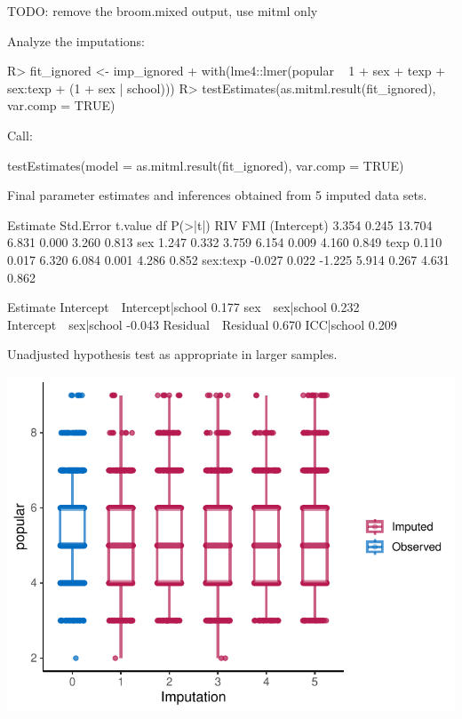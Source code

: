 \documentclass[
]{jss}
\begin{document}
TODO: remove the broom.mixed output, use mitml only

Analyze the imputations:

\begin{CodeChunk}
\begin{CodeInput}
R> fit_ignored <- imp_ignored %
+   with(lme4::lmer(popular ~ 1 + sex + texp + sex:texp + (1 + sex | school))) 
R> testEstimates(as.mitml.result(fit_ignored), var.comp = TRUE)
\end{CodeInput}
\begin{CodeOutput}

Call:

testEstimates(model = as.mitml.result(fit_ignored), var.comp = TRUE)

Final parameter estimates and inferences obtained from 5 imputed data sets.

             Estimate Std.Error   t.value        df   P(>|t|)       RIV       FMI 
(Intercept)     3.354     0.245    13.704     6.831     0.000     3.260     0.813 
sex             1.247     0.332     3.759     6.154     0.009     4.160     0.849 
texp            0.110     0.017     6.320     6.084     0.001     4.286     0.852 
sex:texp       -0.027     0.022    -1.225     5.914     0.267     4.631     0.862 

                            Estimate 
Intercept~~Intercept|school    0.177 
sex~~sex|school                0.232 
Intercept~~sex|school         -0.043 
Residual~~Residual             0.670 
ICC|school                     0.209 

Unadjusted hypothesis test as appropriate in larger samples.
\end{CodeOutput}
\end{CodeChunk}

\begin{CodeChunk}


\begin{center}\includegraphics{Imputation_of_Incomplete_Multilevel_Data_files/figure-latex/pop_ignored_eval-1} \end{center}

\end{CodeChunk}
\end{document}
